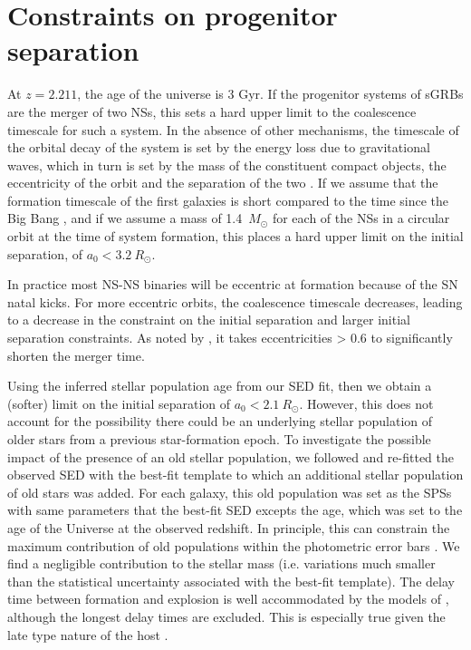\documentclass{aa}    %
\begin{document}
\section{Constraints on progenitor separation}

At $z = 2.211$, the age of the universe is 3 Gyr. If the progenitor systems of
sGRBs are the merger of two NSs, this sets a hard upper limit to the coalescence
timescale for such a system. In the absence of other mechanisms, the timescale
of the orbital decay of the system is set by the energy loss due to
gravitational waves, which in turn is set by the mass of the constituent compact
objects, the eccentricity of the orbit and the separation of the two \citep{Postnov2014}. If we assume that the
formation timescale of the first galaxies is short compared to the time since
the Big Bang \citep{Richard2011}, and if we assume a mass of 1.4~$M_\odot$ for
each of the NSs in a circular orbit at the time of system formation, this places
a hard upper limit on the initial separation, of $a_0 < 3.2~R_\odot$.

In practice most NS-NS binaries will be eccentric at formation because of the SN
natal kicks. For more eccentric orbits, the coalescence timescale decreases,
leading to a decrease in the constraint on the initial separation and larger
initial separation constraints. As noted by \citet{Postnov2014}, it takes
eccentricities > 0.6 to significantly shorten the merger time.

Using the inferred stellar population age from our SED fit, then we obtain a
(softer) limit on the initial separation of $a_0 < 2.1~R_\odot$. However, this
does not account for the possibility there could be an underlying stellar
population of older stars from a previous star-formation epoch. To investigate
the possible impact of the presence of an old stellar population, we followed
\citet{Papovich2001} and re-fitted the observed SED with the best-fit template
to which an additional stellar population of old stars was added. For each
galaxy, this old population was set as the SPSs with same parameters that the
best-fit SED excepts the age, which was set to the age of the Universe at the
observed redshift. In principle, this can constrain the maximum contribution of
old populations within the photometric error bars \citep[see][ for
details]{Papovich2001}. We find a negligible contribution to the stellar mass
(i.e. variations much smaller than the statistical uncertainty associated with
the best-fit template). The delay time between formation and explosion is well
accommodated by the models of \citet{Belczynski2006}, although the longest delay
times are excluded. This is especially true given the late type nature of the
host \citep{OShaughnessy2008}.
\end{document}
